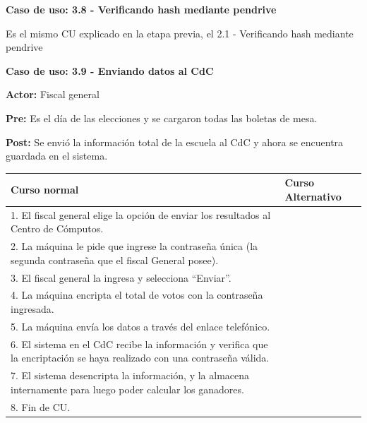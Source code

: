 \textbf{Caso de uso: 3.8 - Verificando hash mediante pendrive}


Es el mismo CU explicado en la etapa previa, el 2.1 - Verificando hash mediante pendrive


\textbf{Caso de uso: 3.9 - Enviando datos al CdC}

\textbf{Actor: }Fiscal general

\textbf{Pre:} Es el día de las elecciones y se cargaron todas las boletas de mesa.

\textbf{Post:} Se envió la información total de la escuela al CdC y ahora se encuentra guardada en el sistema.

\newpage

\begin{table}[h!]
	
 \begin{tabular}{|p{7.5cm} | p{7.5cm}|} 
 \hline
 \textbf{Curso normal} & \textbf{Curso Alternativo} \\
 \hline

1. El fiscal general elige la opción de enviar los resultados al Centro de Cómputos.  & \\
\hline

2. La máquina le pide que ingrese la contraseña única (la segunda contraseña que el fiscal General posee). & \\
\hline

3. El fiscal general la ingresa y selecciona “Enviar”. & \\
\hline

4. La máquina encripta el total de votos con la contraseña ingresada. & \\
\hline

5. La máquina envía los datos a través del enlace telefónico. & \\
\hline

6. El sistema en el CdC recibe la información y verifica que la encriptación se haya realizado con una contraseña válida. & \\
\hline

7. El sistema desencripta la información, y la almacena internamente para luego poder calcular los ganadores. & \\

\hline

8. Fin de CU. & \\
\hline
\end{tabular}
\end{table}
